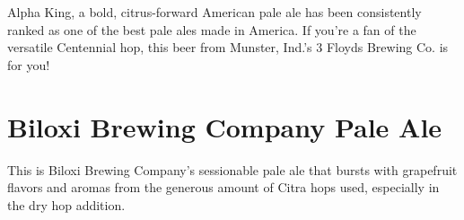 \documentclass[10pt,oneside]{scrbook}
\begin{document}
\begin{aboutblock}
Alpha King, a bold, citrus-forward American pale ale has been consistently ranked as
one of the best pale ales made in America. If you're a fan of the versatile Centennial
hop, this beer from Munster, Ind.'s 3 Floyds Brewing Co. is for you!
\end{aboutblock}


\begin{methodandtiming}
 
\begin{mashsteps}
\end{mashsteps}

\begin{fermentationsteps}
\end{fermentationsteps}

\end{methodandtiming}

\pagebreak

\begin{ingredientsblock}

\begin{malts}
\end{malts}

\begin{hops}
\end{hops}

\begin{yeasts}
\end{yeasts}

\end{ingredientsblock}

\chapter*{Biloxi Brewing Company Pale Ale}

\begin{aboutblock}
This is Biloxi Brewing Company's sessionable pale ale that bursts with grapefruit
flavors and aromas from the generous amount of Citra hops used, especially in the
dry hop addition.
\end{aboutblock}
\end{document}
